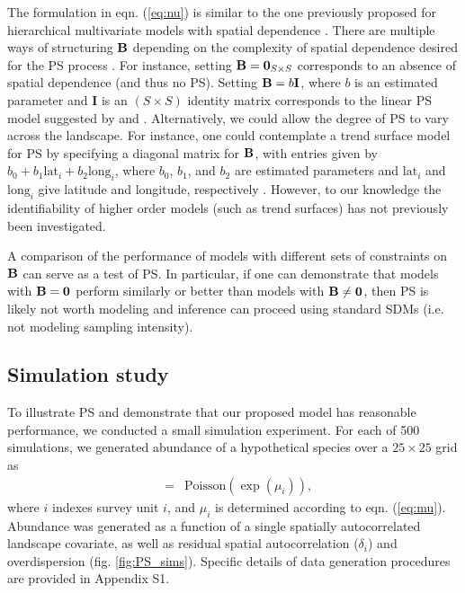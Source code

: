 \documentclass[times,mee,doublespace,]{besauth2}
\begin{document}
 The formulation in eqn. (\ref{eq:nu}) is similar to the one previously proposed for hierarchical multivariate models with spatial dependence \citep[cf.][]{RoyleBerliner1999}.  There are multiple ways of structuring ${\bf B}$ depending on the complexity of spatial dependence desired for the PS process \citep{RoyleBerliner1999}.  For instance, setting ${\bf B} = {\bf 0}_{S \times S}$ corresponds to an absence of spatial dependence (and thus no PS).  Setting ${\bf B} = b {\bf I}$, where $b$ is an estimated parameter and {\bf I} is an $(S \times S)$ identity matrix corresponds to the linear PS model suggested by \citet{DiggleEtAl2010} and \citet{PatiEtAl2011}.  Alternatively, we could allow the degree of PS to vary across the landscape.  For instance, one could contemplate a trend surface model for PS by specifying a diagonal matrix for ${\bf B}$, with entries given by $b_0 + b_1 \textrm{lat}_i + b_2 \textrm{long}_i$, where $b_0$, $b_1$, and $b_2$ are estimated parameters and $\textrm{lat}_i$ and $\textrm{long}_i$ give latitude and longitude, respectively \citep{RoyleBerliner1999}.  However, to our knowledge the identifiability of higher order models (such as trend surfaces) has not previously been investigated.

A comparison of the performance of models with different sets of constraints on ${\bf B}$ can serve as a test of PS.  In particular, if one can demonstrate that models with ${\bf B}={\bf 0}$ perform similarly or better than models with ${\bf B} \ne {\bf 0}$, then PS is likely not worth modeling and inference can proceed using standard SDMs (i.e. not modeling sampling intensity).


\subsection{Simulation study}

To illustrate PS and demonstrate that our proposed model has reasonable performance, we conducted a small simulation experiment.  For each of 500 simulations, we generated abundance of a hypothetical species over a $25 \times 25$ grid as
\begin{eqnarray*}
  [N_i|\mu_i] & = & \textrm{Poisson}(\exp(\mu_i)),
\end{eqnarray*}
where $i$ indexes survey unit $i$, and $\mu_i$ is determined according to eqn. (\ref{eq:mu}). Abundance was generated as a function of a single spatially autocorrelated landscape covariate, as well as residual spatial autocorrelation ($\delta_i$) and overdispersion (fig. \ref{fig:PS_sims}). Specific details of data generation procedures are provided in Appendix S1.
\end{document}
